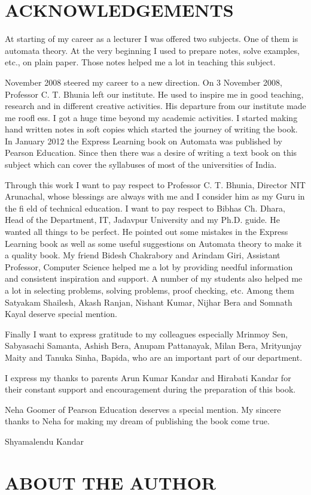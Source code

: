 \documentclass{book}
\newcommand{\NewPart}[1]{\section*{\uppercase{#1}}}
\begin{document}
\NewPart{ Acknowledgements}{}
At starting of my career as a lecturer I was offered two subjects. One of them is automata theory. At the
very beginning I used to prepare notes, solve examples, etc., on plain paper. Those notes helped me a
lot in teaching this subject.\par
November 2008 steered my career to a new direction. On 3 November 2008, Professor C. T. Bhunia
left our institute. He used to inspire me in good teaching, research and in different creative activities.
His departure from our institute made me roofl ess. I got a huge time beyond my academic activities.
I started making hand written notes in soft copies which started the journey of writing the book. In
January 2012 the Express Learning book on Automata was published by Pearson Education. Since then
there was a desire of writing a text book on this subject which can cover the syllabuses of most of the
universities of India.\par
Through this work I want to pay respect to Professor C. T. Bhunia, Director NIT Arunachal, whose
blessings are always with me and I consider him as my Guru in the fi eld of technical education.
I want to pay respect to Bibhas Ch. Dhara, Head of the Department, IT, Jadavpur University and my
Ph.D. guide. He wanted all things to be perfect. He pointed out some mistakes in the Express Learning
book as well as some useful suggestions on Automata theory to make it a quality book.
My friend Bidesh Chakrabory and Arindam Giri, Assistant Professor, Computer Science helped
me a lot by providing needful information and consistent inspiration and support. A number of my
students also helped me a lot in selecting problems, solving problems, proof checking, etc. Among them
Satyakam Shailesh, Akash Ranjan, Nishant Kumar, Nijhar Bera and Somnath Kayal deserve special
mention.\par
Finally I want to express gratitude to my colleagues especially Mrinmoy Sen, Sabyasachi Samanta,
Ashish Bera, Anupam Pattanayak, Milan Bera, Mrityunjay Maity and Tanuka Sinha, Bapida, who are
an important part of our department.\par
I express my thanks to parents Arun Kumar Kandar and Hirabati Kandar for their constant support
and encouragement during the preparation of this book.\par
Neha Goomer of Pearson Education deserves a special mention. My sincere thanks to Neha for
making my dream of publishing the book come true.\par
\begin{minipage}{0.8\textwidth}\raggedleft
Shyamalendu Kandar
\end{minipage}
\newpage
\NewPart{About the Author}{}
\end{document}
